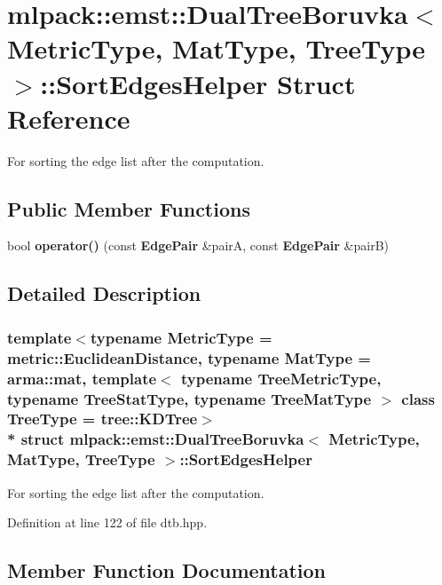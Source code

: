 \section{mlpack\+:\+:emst\+:\+:Dual\+Tree\+Boruvka$<$ Metric\+Type, Mat\+Type, Tree\+Type $>$\+:\+:Sort\+Edges\+Helper Struct Reference}
\label{structmlpack_1_1emst_1_1DualTreeBoruvka_1_1SortEdgesHelper}


For sorting the edge list after the computation.  


\subsection*{Public Member Functions}
\begin{DoxyCompactItemize}
\item 
bool {\bf operator()} (const {\bf Edge\+Pair} \&pairA, const {\bf Edge\+Pair} \&pairB)
\end{DoxyCompactItemize}


\subsection{Detailed Description}
\subsubsection*{template$<$typename Metric\+Type = metric\+::\+Euclidean\+Distance, typename Mat\+Type = arma\+::mat, template$<$ typename Tree\+Metric\+Type, typename Tree\+Stat\+Type, typename Tree\+Mat\+Type $>$ class Tree\+Type = tree\+::\+K\+D\+Tree$>$\\*
struct mlpack\+::emst\+::\+Dual\+Tree\+Boruvka$<$ Metric\+Type, Mat\+Type, Tree\+Type $>$\+::\+Sort\+Edges\+Helper}

For sorting the edge list after the computation. 

Definition at line 122 of file dtb.\+hpp.



\subsection{Member Function Documentation}

